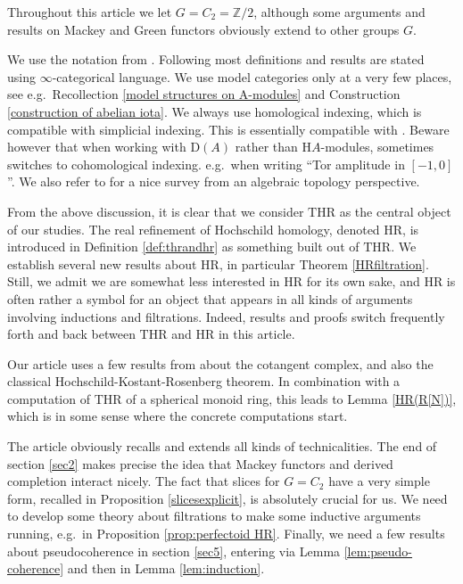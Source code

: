 \documentclass[10pt]{amsart}
\theoremstyle{definition}
\numberwithin{equation}{section}
\newcommand{\Z}{\mathbb{Z}}
\newcommand{\rD}{\mathrm{D}}
\newcommand{\rH}{\mathrm{H}}
\newcommand{\HR}{\mathrm{HR}}
\newcommand{\THR}{\mathrm{THR}}
\begin{document}
Throughout this article we let $G=C_2=\Z/2$, although some arguments and results on Mackey and Green functors obviously extend to other groups $G$. 

We use the notation from \cite{HP23}.
Following \cite{BMS19} most definitions and results are stated using $\infty$-categorical language.
We use model categories only at a very few places,  see e.g.\ Recollection \ref{model structures on A-modules} and Construction \ref{construction of abelian iota}.
We always use homological indexing, which is compatible with simplicial indexing. This is essentially compatible with \cite{BMS19}.
Beware however that when working with $\rD(A)$ rather than $\rH A$-modules, \cite{BMS19} sometimes switches to cohomological indexing. e.g.\ when writing ``Tor amplitude in $[-1,0]$''.
We also refer to \cite{mathew21} for a nice survey from an algebraic topology perspective.


\bigskip



From the above discussion, it is clear that we consider $\THR$ as the central object of our studies. The real refinement of Hochschild homology, denoted $\HR$, is introduced in Definition \ref{def:thrandhr} as something built out of $\THR$. We establish several new results about $\HR$, in particular Theorem \ref{HRfiltration}. Still, we admit we are somewhat less interested in $\HR$ for its own sake,
and $\HR$ is often rather a symbol for an object that appears in all kinds of arguments involving inductions and filtrations. Indeed, results and proofs switch frequently forth and back between $\THR$ and $\HR$ in this article.


Our article uses a few results from \cite{BMS19} about the cotangent complex, and also the classical Hochschild-Kostant-Rosenberg theorem. In combination with a computation of $\THR$ of a spherical monoid ring, this leads to Lemma \ref{HR(R[N])}, which is in some sense where the concrete computations start. 

The article obviously recalls and extends all kinds of technicalities. The end of section \ref{sec2} makes precise the idea that Mackey functors and derived completion interact nicely. The fact that slices for $G=C_2$ have a very simple form, recalled in Proposition \ref{slicesexplicit}, is absolutely crucial for us. We need to develop some theory about filtrations to make some inductive arguments running, e.g.\ in Proposition \ref{prop:perfectoid HR}. Finally, we need a few results about pseudocoherence in section \ref{sec5}, entering via Lemma \ref{lem:pseudo-coherence} and then in Lemma \ref{lem:induction}.
\end{document}
